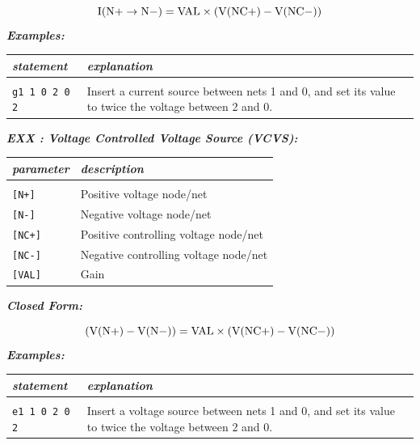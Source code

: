   \[
    \rm{I}(\rm{N+}\to\rm{N-})= \rm{VAL}\times(\rm{V}(\rm{NC+})-\rm{V}(\rm{NC-}))\nonumber
  \]
\textbf{\textit{Examples:}}

\begin{longtable}{l l}
\textit{statement} & \textit{explanation} \\ \hline \\ \vspace{-0.8\parskip} 
\begin{minipage}{15em}\texttt{g1 1 0 2 0 2}\end{minipage}  
& 
\begin{minipage}{15em}{\small Insert a current source between nets 1 and 0, and set its value to twice the voltage between 2 and 0.}\end{minipage}  
\end{longtable}

\textbf{\textit{EXX : Voltage Controlled Voltage Source (VCVS):}}


\begin{longtable}{l l}
\textit{parameter} & \textit{description} \\ \hline \\ \vspace{-0.8\parskip}
\texttt{[N+]} & Positive voltage node/net \\
\texttt{[N-]} & Negative voltage node/net \\
\texttt{[NC+]} & Positive controlling voltage node/net \\
\texttt{[NC-]} & Negative controlling voltage node/net \\
\texttt{[VAL]} & Gain
\end{longtable}

\textbf{\textit{Closed Form:}}

  \[
    (\rm{V}(\rm{N+})-\rm{V}(\rm{N-}))= \rm{VAL}\times(\rm{V}(\rm{NC+})-\rm{V}(\rm{NC-}))\nonumber
  \]
\textbf{\textit{Examples:}}

\begin{longtable}{l l}
\textit{statement} & \textit{explanation} \\ \hline \\ \vspace{-0.8\parskip} 
\begin{minipage}{15em}\texttt{e1 1 0 2 0 2}\end{minipage}  
& 
\begin{minipage}{15em}{\small Insert a voltage source between nets 1 and 0, and set its value to twice the voltage between 2 and 0.}\end{minipage}  
\end{longtable}

